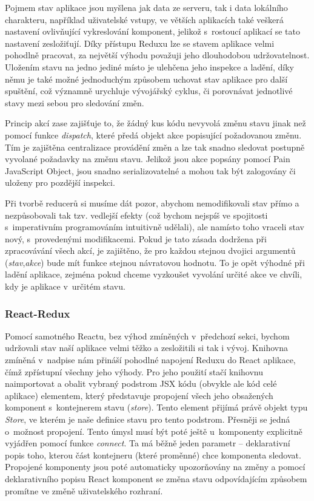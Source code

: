 Pojmem stav aplikace jsou myšlena jak data ze serveru, tak i data lokálního charakteru, například uživatelské vstupy, ve větších aplikacích také veškerá nastavení ovlivňující vykreslování komponent, jelikož s~rostoucí aplikací se tato nastavení zesložiťují. Díky přístupu Reduxu lze se stavem aplikace velmi pohodlně pracovat, za největší výhodu považuji jeho dlouhodobou udržovatelnost. Uložením stavu na jedno jediné místo je ulehčena jeho inspekce a ladění, díky němu je také možné jednoduchým způsobem uchovat stav aplikace pro další spuštění, což významně urychluje vývojářský cyklus, či porovnávat jednotlivé stavy mezi sebou pro sledování změn. 

Princip akcí zase zajišťuje to, že žádný kus kódu nevyvolá změnu stavu jinak než pomocí funkce \textit{dispatch}, které předá objekt akce popisující požadovanou změnu. Tím je zajištěna centralizace provádění změn a lze tak snadno sledovat postupně vyvolané požadavky na změnu stavu. Jelikož jsou akce popsány pomocí Pain JavaScript Object, jsou snadno serializovatelné a mohou tak být zalogovány či uloženy pro pozdější inspekci. 

Při tvorbě reducerů si musíme dát pozor, abychom nemodifikovali stav přímo a nezpůsobovali tak tzv. vedlejší efekty (což bychom nejspíš ve spojitosti s~imperativním programováním intuitivně udělali), ale namísto toho vraceli stav nový, s~provedenými modifikacemi. Pokud je tato zásada dodržena při zpracovávání všech akcí, je zajištěno, že pro každou stejnou dvojici argumentů (\textit{stav},\textit{akce}) bude mít funkce stejnou návratovou hodnotu. To je opět výhodné při ladění aplikace, zejména pokud chceme vyzkoušet vyvolání určité akce ve chvíli, kdy je aplikace v~určitém stavu.

\subsubsection{React-Redux}
Pomocí samotného Reactu, bez výhod zmíněných v~předchozí sekci, bychom udržovali stav naší aplikace velmi těžko a zesložitili si tak i vývoj. Knihovna zmíněná v~nadpise nám přináší pohodlné napojení Reduxu do React aplikace, čímž zpřístupní všechny jeho výhody. Pro jeho použití stačí knihovnu naimportovat a obalit vybraný podstrom JSX kódu (obvykle ale kód celé aplikace) elementem, který představuje propojení všech jeho obsažených komponent s~kontejnerem stavu (\textit{store}). Tento element přijímá právě objekt typu \textit{Store}, ve kterém je naše definice stavu pro tento podstrom. Přesněji se jedná o~možnost propojení. Tento úmysl musí být poté ještě u~komponenty explicitně vyjádřen pomocí funkce \textit{connect}. Ta má běžně jeden parametr -- deklarativní popis toho, kterou část kontejneru (které proměnné) chce komponenta sledovat. Propojené komponenty jsou poté automaticky upozorňovány na změny a pomocí deklarativního popisu React komponent se změna stavu odpovídajícím způsobem promítne ve změně uživatelského rozhraní.

